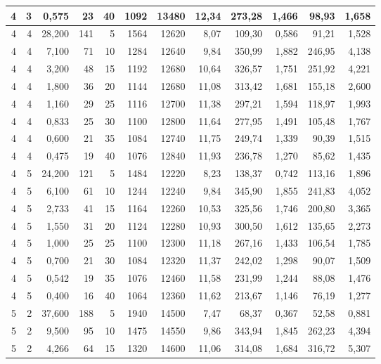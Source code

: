 \begin{tabular}{rrrrrrrrrrrr}
4 & 3 & 0,575 & 23 & 40 & 1092 & 13480 & 12,34 & 273,28 & 1,466 & 98,93 & 1,658 \\ \hline
4 & 4 & 28,200 & 141 & 5 & 1564 & 12620 & 8,07 & 109,30 & 0,586 & 91,21 & 1,528 \\ \hline
4 & 4 & 7,100 & 71 & 10 & 1284 & 12640 & 9,84 & 350,99 & 1,882 & 246,95 & 4,138 \\ \hline
4 & 4 & 3,200 & 48 & 15 & 1192 & 12680 & 10,64 & 326,57 & 1,751 & 251,92 & 4,221 \\ \hline
4 & 4 & 1,800 & 36 & 20 & 1144 & 12680 & 11,08 & 313,42 & 1,681 & 155,18 & 2,600 \\ \hline
4 & 4 & 1,160 & 29 & 25 & 1116 & 12700 & 11,38 & 297,21 & 1,594 & 118,97 & 1,993 \\ \hline
4 & 4 & 0,833 & 25 & 30 & 1100 & 12800 & 11,64 & 277,95 & 1,491 & 105,48 & 1,767 \\ \hline
4 & 4 & 0,600 & 21 & 35 & 1084 & 12740 & 11,75 & 249,74 & 1,339 & 90,39 & 1,515 \\ \hline
4 & 4 & 0,475 & 19 & 40 & 1076 & 12840 & 11,93 & 236,78 & 1,270 & 85,62 & 1,435 \\ \hline
4 & 5 & 24,200 & 121 & 5 & 1484 & 12220 & 8,23 & 138,37 & 0,742 & 113,16 & 1,896 \\ \hline
4 & 5 & 6,100 & 61 & 10 & 1244 & 12240 & 9,84 & 345,90 & 1,855 & 241,83 & 4,052 \\ \hline
4 & 5 & 2,733 & 41 & 15 & 1164 & 12260 & 10,53 & 325,56 & 1,746 & 200,80 & 3,365 \\ \hline
4 & 5 & 1,550 & 31 & 20 & 1124 & 12280 & 10,93 & 300,50 & 1,612 & 135,65 & 2,273 \\ \hline
4 & 5 & 1,000 & 25 & 25 & 1100 & 12300 & 11,18 & 267,16 & 1,433 & 106,54 & 1,785 \\ \hline
4 & 5 & 0,700 & 21 & 30 & 1084 & 12320 & 11,37 & 242,02 & 1,298 & 90,07 & 1,509 \\ \hline
4 & 5 & 0,542 & 19 & 35 & 1076 & 12460 & 11,58 & 231,99 & 1,244 & 88,08 & 1,476 \\ \hline
4 & 5 & 0,400 & 16 & 40 & 1064 & 12360 & 11,62 & 213,67 & 1,146 & 76,19 & 1,277 \\ \hline
5 & 2 & 37,600 & 188 & 5 & 1940 & 14500 & 7,47 & 68,37 & 0,367 & 52,58 & 0,881 \\ \hline
5 & 2 & 9,500 & 95 & 10 & 1475 & 14550 & 9,86 & 343,94 & 1,845 & 262,23 & 4,394 \\ \hline
5 & 2 & 4,266 & 64 & 15 & 1320 & 14600 & 11,06 & 314,08 & 1,684 & 316,72 & 5,307 \\ \hline

\end{tabular}
